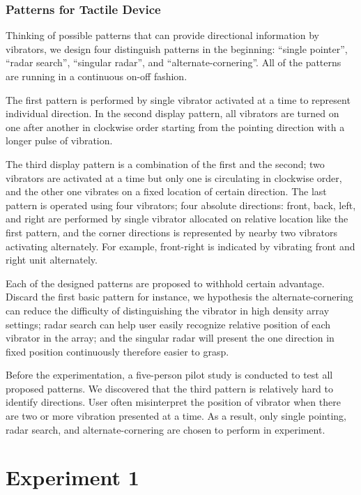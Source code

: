 \documentclass{sigchi}
\begin{document}
\subsubsection{Patterns for Tactile Device}
Thinking of possible patterns that can provide directional information by vibrators, we design four distinguish patterns in the beginning: \textquotedblleft single pointer\textquotedblright, \textquotedblleft radar search\textquotedblright, \textquotedblleft singular radar\textquotedblright, and \textquotedblleft alternate-cornering\textquotedblright.
All of the patterns are running in a continuous on-off fashion.

The first pattern is performed by single vibrator activated at a time to represent individual direction. In the second display pattern, all vibrators are turned on one after another in clockwise order starting from the pointing direction with a longer pulse of vibration. 

The third display pattern is a combination of the first and the second; two vibrators are activated at a time but only one is circulating in clockwise order, and the other one vibrates on a fixed location of certain direction. The last pattern is operated using four vibrators; four absolute directions: front, back, left, and right are performed by single vibrator allocated on relative location like the first pattern, and the corner directions is represented by nearby two vibrators activating alternately. For example, front-right is indicated by vibrating front and right unit alternately.

Each of the designed patterns are proposed to withhold certain advantage. Discard the first basic pattern for instance, we hypothesis the alternate-cornering can reduce the difficulty of distinguishing the vibrator in high density array settings; radar search can help user easily recognize relative position of each vibrator in the array; and the singular radar will present the one direction in fixed position continuously therefore easier to grasp.

Before the experimentation, a five-person pilot study is conducted to test all proposed patterns. We discovered that the third pattern is relatively hard to identify directions. User often misinterpret the position of vibrator when there are two or more vibration presented at a time. As a result, only single pointing, radar search, and alternate-cornering are chosen to perform in experiment.

\section{Experiment 1}
\end{document}
